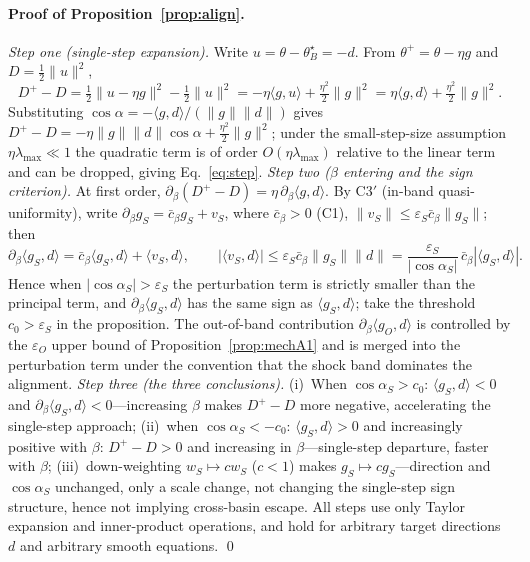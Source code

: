 \documentclass[11pt]{article}
\numberwithin{equation}{section}
\begin{document}
\paragraph{Proof of Proposition~\ref{prop:align}.}
\emph{Step one (single-step expansion).} Write $u=\theta-\theta_B^\star=-d$. From $\theta^+=\theta-\eta g$ and $D=\tfrac12\|u\|^2$,
\[
D^+-D=\tfrac12\|u-\eta g\|^2-\tfrac12\|u\|^2
=-\eta\langle g,u\rangle+\tfrac{\eta^2}{2}\|g\|^2
=\eta\langle g,d\rangle+\tfrac{\eta^2}{2}\|g\|^2.
\]
Substituting $\cos\alpha=-\langle g,d\rangle/(\|g\|\|d\|)$ gives $D^+-D=-\eta\|g\|\|d\|\cos\alpha+\tfrac{\eta^2}{2}\|g\|^2$; under the small-step-size assumption $\eta\lambda_{\max}\ll1$ the quadratic term is of order $O(\eta\lambda_{\max})$ relative to the linear term and can be dropped, giving Eq.~\eqref{eq:step}.
\emph{Step two ($\beta$ entering and the sign criterion).} At first order, $\partial_\beta(D^+-D)=\eta\,\partial_\beta\langle g,d\rangle$. By C3$'$ (in-band quasi-uniformity), write $\partial_\beta g_S=\bar c_\beta g_S+v_S$, where $\bar c_\beta>0$ (C1), $\|v_S\|\le\varepsilon_S\bar c_\beta\|g_S\|$; then
\[
\partial_\beta\langle g_S,d\rangle=\bar c_\beta\langle g_S,d\rangle+\langle v_S,d\rangle,\qquad
|\langle v_S,d\rangle|\le\varepsilon_S\bar c_\beta\|g_S\|\|d\|=\frac{\varepsilon_S}{|\cos\alpha_S|}\,\bar c_\beta|\langle g_S,d\rangle|.
\]
Hence when $|\cos\alpha_S|>\varepsilon_S$ the perturbation term is strictly smaller than the principal term, and $\partial_\beta\langle g_S,d\rangle$ has the same sign as $\langle g_S,d\rangle$; take the threshold $c_0>\varepsilon_S$ in the proposition. The out-of-band contribution $\partial_\beta\langle g_O,d\rangle$ is controlled by the $\varepsilon_O$ upper bound of Proposition~\ref{prop:mechA1} and is merged into the perturbation term under the convention that the shock band dominates the alignment.
\emph{Step three (the three conclusions).} (i)~When $\cos\alpha_S>c_0$: $\langle g_S,d\rangle<0$ and $\partial_\beta\langle g_S,d\rangle<0$---increasing $\beta$ makes $D^+-D$ more negative, accelerating the single-step approach; (ii)~when $\cos\alpha_S<-c_0$: $\langle g_S,d\rangle>0$ and increasingly positive with $\beta$: $D^+-D>0$ and increasing in $\beta$---single-step departure, faster with $\beta$; (iii)~down-weighting $w_S\mapsto cw_S$ ($c<1$) makes $g_S\mapsto cg_S$---direction and $\cos\alpha_S$ unchanged, only a scale change, not changing the single-step sign structure, hence not implying cross-basin escape. All steps use only Taylor expansion and inner-product operations, and hold for arbitrary target directions $d$ and arbitrary smooth equations. \qed
\end{document}
